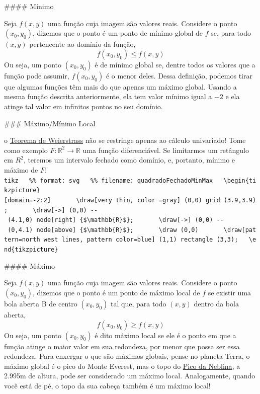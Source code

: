\documentclass[
  letterpaper,
  DIV=11,
  numbers=noendperiod]{scrreprt}
\begin{document}
\#\#\#\# Mínimo

Seja \(f(x,y)\) uma função cuja imagem são valores reais. Considere o
ponto \((x_0, y_0)\), dizemos que o ponto é um ponto de mínimo global de
\(f\) se, para todo \((x,y)\) pertencente ao domínio da função, \[
  f(x_0, y_0) \leq f(x,y)
  \] Ou seja, um ponto \((x_0, y_0)\) é de mínimo global se, dentre
todos os valores que a função pode assumir, \(f(x_0, y_0)\) é o menor
deles. Dessa definição, podemos tirar que algumas funções têm mais do
que apenas um máximo global. Usando a mesma função descrita
anteriormente, ela tem valor mínimo igual a \(-2\) e ela atinge tal
valor em infinitos pontos no seu domínio.

\#\#\# Máximo/Mínimo Local

o \href{weierstrass.qmd}{Teorema de Weierstrass} não se restringe apenas
ao cálculo univariado! Tome como exemplo
\(F: \mathbb{R}^2 \rightarrow \mathbb{R}\) uma função diferenciável. Se
limitarmos um retângulo em \(R^2\), teremos um intervalo fechado como
domínio, e, portanto, mínimo e máximo de \(F\):
\texttt{tikz\ \ \ \%\%\textbar{}\ format:\ svg\ \ \ \%\%\textbar{}\ filename:\ quadradoFechadoMinMax\ \ \ \textbackslash{}begin\{tikzpicture\}{[}domain=-2:2{]}\ \ \ \ \ \ \ \textbackslash{}draw{[}very\ thin,\ color\ =gray{]}\ (0,0)\ grid\ (3.9,3.9);\ \ \ \ \ \ \ \textbackslash{}draw{[}-\textgreater{}{]}\ (0,0)\ -\/-\ (4.1,0)\ node{[}right{]}\ \{\$\textbackslash{}mathbb\{R\}\$\};\ \ \ \ \ \ \ \textbackslash{}draw{[}-\textgreater{}{]}\ (0,0)\ -\/-\ (0,4.1)\ node{[}above{]}\ \{\$\textbackslash{}mathbb\{R\}\$\};\ \ \ \ \ \ \ \textbackslash{}draw\ (0,0)\ \ \ \ \ \ \ \textbackslash{}draw{[}pattern=north\ west\ lines,\ pattern\ color=blue{]}\ (1,1)\ rectangle\ (3,3);\ \ \ \textbackslash{}end\{tikzpicture\}}

\#\#\#\# Máximo

Seja \(f(x,y)\) uma função cuja imagem são valores reais. Considere o
ponto \((x_0, y_0)\), dizemos que o ponto é um ponto de máximo local de
\(f\) se existir uma bola aberta B de centro \((x_0, y_0)\) tal que,
para todo \((x,y)\) dentro da bola aberta, \[
  f(x_0,y_0) \geq f(x,y)
  \] Ou seja, um ponto \((x_0, y_0)\) é dito máximo local se ele é o
ponto em que a função atinge o maior valor em sua redondeza, por menor
que possa ser essa redondeza. Para enxergar o que são máximos globais,
pense no planeta Terra, o máximo global é o pico do Monte Everest, mas o
topo do \href{https://pt.wikipedia.org/wiki/Pico_da_Neblina}{Pico da
Neblina}, a 2.995m de altura, pode ser considerado um máximo local.
Analogamente, quando você está de pé, o topo da sua cabeça também é um
máximo local!
\end{document}
